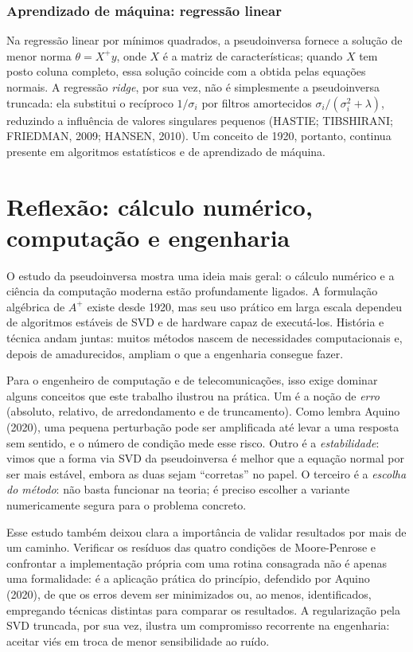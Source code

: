 \documentclass[12pt,a4paper,oneside]{report}
\newcommand{\Ap}{A^{+}}
\begin{document}
\subsection{Aprendizado de máquina: regressão linear}

Na regressão linear por mínimos quadrados, a pseudoinversa fornece a solução de menor norma
$\theta = X^{+} y$, onde $X$ é a matriz de características; quando $X$ tem posto coluna completo, essa solução coincide com a obtida pelas equações normais. A regressão \emph{ridge}, por sua vez, não é simplesmente a pseudoinversa truncada: ela substitui o recíproco $1/\sigma_i$ por filtros amortecidos $\sigma_i/(\sigma_i^2+\lambda)$, reduzindo a influência de valores singulares pequenos (HASTIE; TIBSHIRANI; FRIEDMAN, 2009; HANSEN, 2010). Um conceito de 1920, portanto, continua presente em algoritmos estatísticos e de aprendizado de máquina.

\chapter{Reflexão: cálculo numérico, computação e engenharia}

O estudo da pseudoinversa mostra uma ideia mais geral: o cálculo numérico e a ciência da computação moderna estão profundamente ligados. A formulação algébrica de $\Ap$ existe desde 1920, mas seu uso prático em larga escala dependeu de algoritmos estáveis de SVD e de hardware capaz de executá-los. História e técnica andam juntas: muitos métodos nascem de necessidades computacionais e, depois de amadurecidos, ampliam o que a engenharia consegue fazer.

Para o engenheiro de computação e de telecomunicações, isso exige dominar alguns conceitos que este trabalho ilustrou na prática. Um é a noção de \emph{erro} (absoluto, relativo, de arredondamento e de truncamento). Como lembra Aquino (2020), uma pequena perturbação pode ser amplificada até levar a uma resposta sem sentido, e o número de condição mede esse risco. Outro é a \emph{estabilidade}: vimos que a forma via SVD da pseudoinversa é melhor que a equação normal por ser mais estável, embora as duas sejam ``corretas'' no papel. O terceiro é a \emph{escolha do método}: não basta funcionar na teoria; é preciso escolher a variante numericamente segura para o problema concreto.

Esse estudo também deixou clara a importância de validar resultados por mais de um caminho. Verificar os resíduos das quatro condições de Moore-Penrose e confrontar a implementação própria com uma rotina consagrada não é apenas uma formalidade: é a aplicação prática do princípio, defendido por Aquino (2020), de que os erros devem ser minimizados ou, ao menos, identificados, empregando técnicas distintas para comparar os resultados. A regularização pela SVD truncada, por sua vez, ilustra um compromisso recorrente na engenharia: aceitar viés em troca de menor sensibilidade ao ruído.
\end{document}
